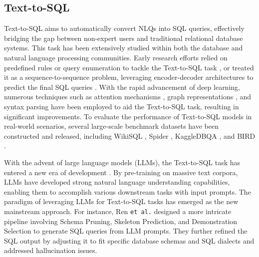 \subsection{Text-to-SQL}
Text-to-SQL aims to automatically convert NLQs into SQL queries, effectively bridging the gap between non-expert users and traditional relational database systems. This task has been extensively studied within both the database and natural language processing communities. Early research efforts relied on predefined rules or query enumeration to tackle the Text-to-SQL task \cite{10.14778/3407790.3407858,DBS-078,10.1145/3318464.3389776}, or treated it as a sequence-to-sequence problem, leveraging encoder-decoder architectures to predict the final SQL queries \cite{qi-etal-2022-rasat,popescu-etal-2022-addressing,10.5555/3304222.3304323}. With the rapid advancement of deep learning, numerous techniques such as attention mechanisms \cite{10191914}, graph representations \cite{hui-etal-2022-s2sql,10.1609/aaai.v37i11.26536,qi-etal-2022-rasat,wang-etal-2020-rat,xu-etal-2018-sql,zheng-etal-2022-hie}, and syntax parsing \cite{guo-etal-2019-towards,10.1609/aaai.v37i11.26535,scholak-etal-2021-picard,10.1145/3534678.3539305} have been employed to aid the Text-to-SQL task, resulting in significant improvements. To evaluate the performance of Text-to-SQL models in real-world scenarios, several large-scale benchmark datasets have been constructed and released, including WikiSQL \cite{zhong2017seq2sqlgeneratingstructuredqueries}, Spider \cite{yu-etal-2018-spider}, KaggleDBQA \cite{lee-etal-2021-kaggledbqa}, and BIRD \cite{NEURIPS2023_83fc8fab}. 

With the advent of large language models (LLMs), the Text-to-SQL task has entered a new era of development \cite{10.14778/3641204.3641221,NEURIPS2023_72223cc6,dong2023c3zeroshottexttosqlchatgpt,10.1145/3654930,nan-etal-2023-enhancing,ren2024purplemakinglargelanguage,10.1145/3589292}. By pre-training on massive text corpora, LLMs have developed strong natural language understanding capabilities, enabling them to accomplish various downstream tasks with input prompts. The paradigm of leveraging LLMs for Text-to-SQL tasks has emerged as the new mainstream approach. For instance, Ren \texttt{et al.} \cite{ren2024purplemakinglargelanguage} designed a more intricate pipeline involving Schema Pruning, Skeleton Prediction, and Demonstration Selection to generate SQL queries from LLM prompts. They further refined the SQL output by adjusting it to fit specific database schemas and SQL dialects and addressed hallucination issues.

